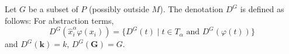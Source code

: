 Let $G$ be a subset of $P$ (possibly outside $M$). The denotation $D^G$ is defined as follows: For abstraction terms,
$$D^G(\hat{x}_i^\alpha \varphi(x_i)) = \{D^G(t) \mid t \in T_\alpha \text{ and } D^G(\varphi(t))\}$$
and $D^G(\mathbf{k}) = k$, $D^G(\mathbf{G}) = G$.
